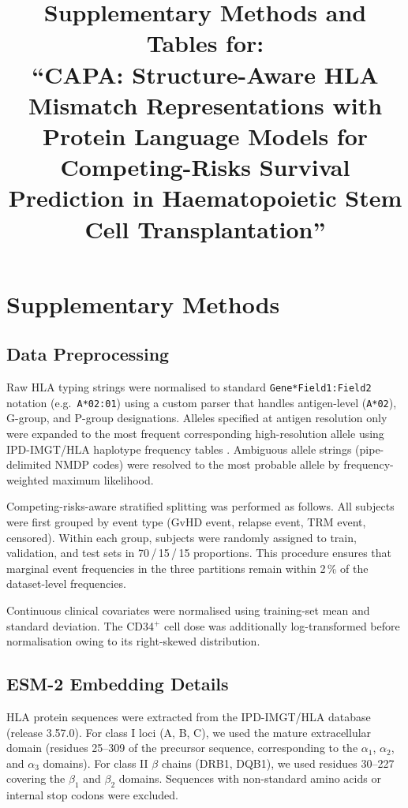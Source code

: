 \documentclass[12pt]{article}
\title{\large\bfseries Supplementary Methods and Tables for:\\
  ``CAPA: Structure-Aware HLA Mismatch Representations with Protein Language
  Models for Competing-Risks Survival Prediction in Haematopoietic Stem Cell
  Transplantation''}
\author{}
\date{}
\begin{document}
\maketitle
\tableofcontents
\newpage

\section{Supplementary Methods}

\subsection{Data Preprocessing}

Raw HLA typing strings were normalised to standard \texttt{Gene*Field1:Field2}
notation (e.g.\ \texttt{A*02:01}) using a custom parser that handles
antigen-level (\texttt{A*02}), G-group, and P-group designations.  Alleles
specified at antigen resolution only were expanded to the most frequent
corresponding high-resolution allele using IPD-IMGT/HLA haplotype frequency
tables \citep{maiers2007hlafreq}.  Ambiguous allele strings (pipe-delimited
NMDP codes) were resolved to the most probable allele by frequency-weighted
maximum likelihood.

Competing-risks-aware stratified splitting was performed as follows.  All
subjects were first grouped by event type (GvHD event, relapse event, TRM
event, censored).  Within each group, subjects were randomly assigned to
train, validation, and test sets in 70\,/\,15\,/\,15 proportions.  This
procedure ensures that marginal event frequencies in the three partitions
remain within 2\,\% of the dataset-level frequencies.

Continuous clinical covariates were normalised using training-set mean and
standard deviation.  The CD34$^+$ cell dose was additionally log-transformed
before normalisation owing to its right-skewed distribution.

\subsection{ESM-2 Embedding Details}

HLA protein sequences were extracted from the IPD-IMGT/HLA database
(release 3.57.0).  For class I loci (A, B, C), we used the
mature extracellular domain (residues 25--309 of the precursor sequence,
corresponding to the $\alpha_1$, $\alpha_2$, and $\alpha_3$ domains).  For
class II $\beta$ chains (DRB1, DQB1), we used residues 30--227 covering the
$\beta_1$ and $\beta_2$ domains.  Sequences with non-standard amino acids
or internal stop codons were excluded.
\end{document}

